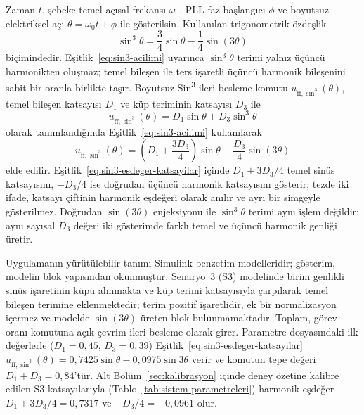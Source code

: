 Zaman $t$, şebeke temel açısal frekansı $\omega_0$, PLL faz başlangıcı $\phi$ ve boyutsuz elektriksel açı $\theta=\omega_0t+\phi$ ile gösterilsin. Kullanılan trigonometrik özdeşlik
\begin{equation}
  \sin^3\theta=\frac{3}{4}\sin\theta-\frac{1}{4}\sin(3\theta)
  \label{eq:sin3-acilimi}
\end{equation}
biçimindedir. Eşitlik~\eqref{eq:sin3-acilimi} uyarınca $\sin^3\theta$ terimi yalnız üçüncü harmonikten oluşmaz; temel bileşen ile ters işaretli üçüncü harmonik bileşenini sabit bir oranla birlikte taşır. Boyutsuz Sin\textsuperscript{3} ileri besleme komutu $u_{\mathrm{ff},\sin^3}(\theta)$, temel bileşen katsayısı $D_1$ ve küp teriminin katsayısı $D_3$ ile
\begin{equation}
  u_{\mathrm{ff},\sin^3}(\theta)=D_1\sin\theta+D_3\sin^3\theta
  \label{eq:sin3-genel-komut}
\end{equation}
olarak tanımlandığında Eşitlik~\eqref{eq:sin3-acilimi} kullanılarak
\begin{equation}
  u_{\mathrm{ff},\sin^3}(\theta)
  =\left(D_1+\frac{3D_3}{4}\right)\sin\theta-\frac{D_3}{4}\sin(3\theta)
  \label{eq:sin3-esdeger-katsayilar}
\end{equation}
elde edilir. Eşitlik~\eqref{eq:sin3-esdeger-katsayilar} içinde $D_1+3D_3/4$ temel sinüs katsayısını, $-D_3/4$ ise doğrudan üçüncü harmonik katsayısını gösterir; tezde iki ifade, katsayı çiftinin harmonik eşdeğeri olarak anılır ve ayrı bir simgeyle gösterilmez. Doğrudan $\sin(3\theta)$ enjeksiyonu ile $\sin^3\theta$ terimi aynı işlem değildir: aynı sayısal $D_3$ değeri iki gösterimde farklı temel ve üçüncü harmonik genliği üretir.

Uygulamanın yürütülebilir tanımı Simulink benzetim modelleridir; gösterim, modelin blok yapısından okunmuştur. Senaryo~3 (S3) modelinde birim genlikli sinüs işaretinin küpü alınmakta ve küp terimi katsayısıyla çarpılarak temel bileşen terimine eklenmektedir; terim pozitif işaretlidir, ek bir normalizasyon içermez ve modelde $\sin(3\theta)$ üreten blok bulunmamaktadır. Toplam, görev oranı komutuna açık çevrim ileri besleme olarak girer. Parametre dosyasındaki ilk değerlerle ($D_1=0{,}45$, $D_3=0{,}39$) Eşitlik~\eqref{eq:sin3-esdeger-katsayilar} $u_{\mathrm{ff},\sin^3}(\theta)=0{,}7425\sin\theta-0{,}0975\sin3\theta$ verir ve komutun tepe değeri $D_1+D_3=0{,}84$'tür. Alt Bölüm~\ref{sec:kalibrasyon} içinde deney özetine kalibre edilen S3 katsayılarıyla (Tablo~\ref{tab:sistem-parametreleri}) harmonik eşdeğer $D_1+3D_3/4=0{,}7317$ ve $-D_3/4=-0{,}0961$ olur.

